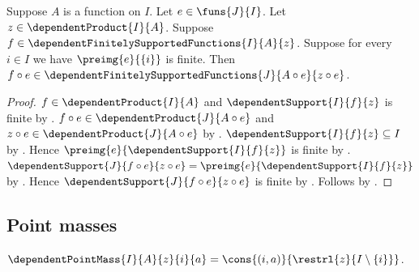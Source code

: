 \begin{theorem}\label{spike_finite_support_precomposition}
    Suppose $A$ is a function on $I$.
    Let $e\in\funs{J}{I}$.
    Let $z\in\dependentProduct{I}{A}$.
    Suppose $f\in\dependentFinitelySupportedFunctions{I}{A}{z}$.
    Suppose for every $i\in I$ we have
        $\preimg{e}{\{i\}}$ is finite.
    Then
        $f\circ e\in
            \dependentFinitelySupportedFunctions
                {J}{A\circ e}{z\circ e}$.
\end{theorem}
\begin{proof}
    $f\in\dependentProduct{I}{A}$ and
        $\dependentSupport{I}{f}{z}$ is finite by
        .
    $f\circ e\in\dependentProduct{J}{A\circ e}$ and
        $z\circ e\in\dependentProduct{J}{A\circ e}$ by
        .
    $\dependentSupport{I}{f}{z}\subseteq I$ by
        .
    Hence $\preimg{e}{\dependentSupport{I}{f}{z}}$ is finite by
        .
    $\dependentSupport{J}{f\circ e}{z\circ e}
        =\preimg{e}{\dependentSupport{I}{f}{z}}$ by
        .
    Hence $\dependentSupport{J}{f\circ e}{z\circ e}$ is finite by
        \auto.
    Follows by
        .
\end{proof}

\subsection{Point masses}

\begin{definition}\label{spike_dependent_point_mass}
    $\dependentPointMass{I}{A}{z}{i}{a}
        =\cons{(i,a)}{\restrl{z}{I\setminus\{i\}}}$.
\end{definition}

